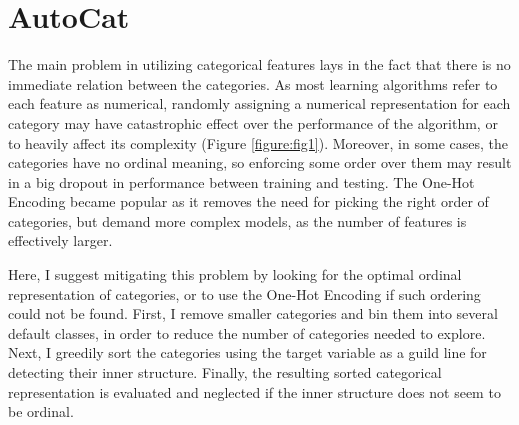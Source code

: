 \documentclass{article}
\begin{document}
\section{AutoCat}
The main problem in utilizing categorical features lays in the fact that there is no immediate relation between the categories. As most learning algorithms refer to each feature as numerical, randomly assigning a numerical representation for each category may have catastrophic effect over the performance of the algorithm, or to heavily affect its complexity (Figure \ref{figure:fig1}). Moreover, in some cases, the categories have no ordinal meaning, so enforcing some order over them may result in a big dropout in performance between training and testing. The One-Hot Encoding became popular as it removes the need for picking the right order of categories, but demand more complex models, as the number of features is effectively larger. 

Here, I suggest mitigating this problem by looking for the optimal ordinal representation of categories, or to use the One-Hot Encoding if such ordering could not be found. First, I remove smaller categories and bin them into several default classes, in order to reduce the number of categories needed to explore. Next, I greedily sort the categories using the target variable as a guild line for detecting their inner structure. Finally, the resulting sorted categorical representation is evaluated and neglected if the inner structure does not seem to be ordinal.
\end{document}
